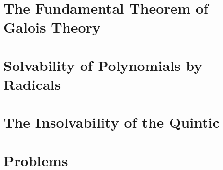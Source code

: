 \section{The Fundamental Theorem of Galois Theory}

\section{Solvability of Polynomials by Radicals}

\section{The Insolvability of the Quintic}

\newpage

\section{Problems}
